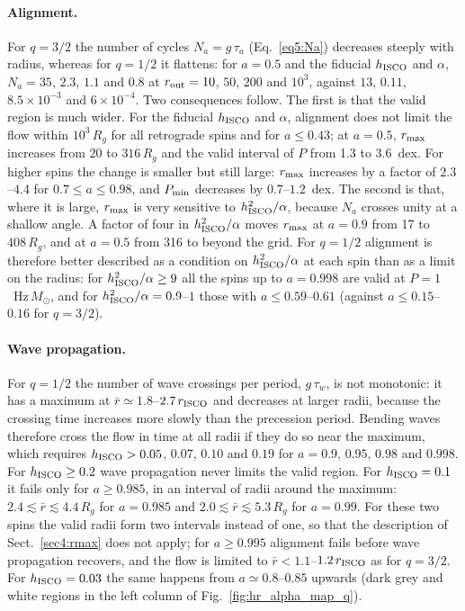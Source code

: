 \paragraph{Alignment.}
For $q=3/2$ the number of cycles $N_a=g\,\tau_a$ (Eq.~\ref{eq5:Na}) decreases steeply with radius, whereas for $q=1/2$ it flattens: for $a=0.5$ and the fiducial $h_\textup{ISCO}$ and $\alpha$, $N_a=35$, $2.3$, $1.1$ and $0.8$ at $r_\textup{out}=10$, $50$, $200$ and $10^3$, against $13$, $0.11$, $8.5\times10^{-3}$ and $6\times10^{-4}$.
Two consequences follow.
The first is that the valid region is much wider.
For the fiducial $h_\textup{ISCO}$ and $\alpha$, alignment does not limit the flow within $10^3\,R_g$ for all retrograde spins and for $a\leq0.43$; at $a=0.5$, $r_\textup{max}$ increases from 20 to $316\,R_g$ and the valid interval of $P$ from 1.3 to 3.6~dex.
For higher spins the change is smaller but still large: $r_\textup{max}$ increases by a factor of $2.3$--$4.4$ for $0.7\leq a\leq0.98$, and $P_\textup{min}$ decreases by $0.7$--$1.2$~dex.
The second is that, where it is large, $r_\textup{max}$ is very sensitive to $h_\textup{ISCO}^2/\alpha$, because $N_a$ crosses unity at a shallow angle.
A factor of four in $h_\textup{ISCO}^2/\alpha$ moves $r_\textup{max}$ at $a=0.9$ from 17 to $408\,R_g$, and at $a=0.5$ from 316 to beyond the grid.
For $q=1/2$ alignment is therefore better described as a condition on $h_\textup{ISCO}^2/\alpha$ at each spin than as a limit on the radius: for $h_\textup{ISCO}^2/\alpha\geq9$ all the spins up to $a=0.998$ are valid at $P=1$~Hz\,$M_\odot$, and for $h_\textup{ISCO}^2/\alpha=0.9$--$1$ those with $a\leq0.59$--$0.61$ (against $a\leq0.15$--$0.16$ for $q=3/2$).

\paragraph{Wave propagation.}
For $q=1/2$ the number of wave crossings per period, $g\,\tau_w$, is not monotonic: it has a maximum at $\bar r\simeq1.8$--$2.7\,r_\textup{ISCO}$ and decreases at larger radii, because the crossing time increases more slowly than the precession period.
Bending waves therefore cross the flow in time at all radii if they do so near the maximum, which requires $h_\textup{ISCO}>0.05$, $0.07$, $0.10$ and $0.19$ for $a=0.9$, $0.95$, $0.98$ and $0.998$.
For $h_\textup{ISCO}\geq0.2$ wave propagation never limits the valid region.
For $h_\textup{ISCO}=0.1$ it fails only for $a\geq0.985$, in an interval of radii around the maximum: $2.4\lesssim\bar r\lesssim4.4\,R_g$ for $a=0.985$ and $2.0\lesssim\bar r\lesssim5.3\,R_g$ for $a=0.99$.
For these two spins the valid radii form two intervals instead of one, so that the description of Sect.~\ref{sec4:rmax} does not apply; for $a\geq0.995$ alignment fails before wave propagation recovers, and the flow is limited to $\bar r<1.1$--$1.2\,r_\textup{ISCO}$ as for $q=3/2$.
For $h_\textup{ISCO}=0.03$ the same happens from $a\simeq0.8$--$0.85$ upwards (dark grey and white regions in the left column of Fig.~\ref{fig:hr_alpha_map_q}).

